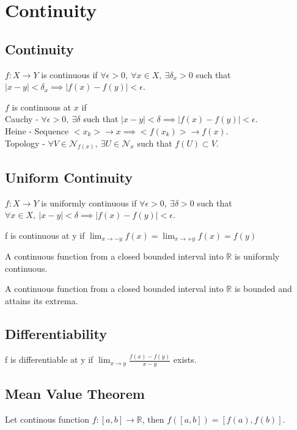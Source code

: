 \chapter{Continuity}
\section{Continuity}
	\begin{definition}
		$f : X \to Y$ is continuous if $\forall \epsilon > 0,\ \forall x \in X,\  \exists \delta_x > 0 $ such that $|x-y|<\delta_x \implies |f(x)-f(y)|<\epsilon$.
	\end{definition}
	\begin{definition}[continuity]$f$ is continuous at $x$ if\\
		Cauchy - $\forall \epsilon > 0,\ \exists \delta$ such that $|x-y|<\delta \implies |f(x)-f(y)|<\epsilon$.\\
		Heine - Sequence $<x_k> \to x \implies <f(x_k)> \to f(x)$.\\
		Topology - $\forall V \in \mathcal{N}_{f(x)},\ \exists U \in \mathcal{N}_x$ such that $f(U) \subset V$.
	\end{definition}
\section{Uniform Continuity}
	\begin{definition}
		$f : X \to Y$ is uniformly continuous if $\forall \epsilon > 0,\ \exists \delta > 0$ such that $\forall x \in X,\ |x-y|<\delta \implies |f(x)-f(y)|<\epsilon$.
	\end{definition}
	\begin{remark}
		f is continuous at y if $\lim_{x\to-y} f(x) = \lim_{x\to+y}f(x)=f(y)$\\
	\end{remark}
	\begin{theorem}
		A continuous function from a closed bounded interval into $\mathbb{R}$ is uniformly continuous.
	\end{theorem}
	\begin{theorem}
		A continuous function from a closed bounded interval into $\mathbb{R}$ is bounded and attains its extrema.
	\end{theorem}

\section{Differentiability}
	\begin{definition}
		f is differentiable at y if $\lim_{x\to y} \frac{f(x)-f(y)}{x-y}$ exists.
	\end{definition}

\section{Mean Value Theorem}
	\begin{theorem}
		Let continous function $f:[a,b]\to\mathbb{R}$, then $f([a,b]) = [f(a),f(b)]$.
	\end{theorem}
